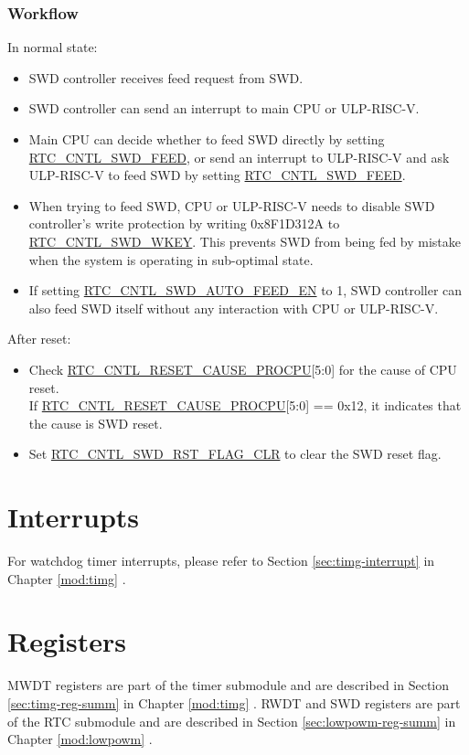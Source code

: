 \documentclass[main\_\_EN.tex]{subfiles}
\begin{document}
\subsubsection{Workflow}
In normal state:
\begin{itemize}
    \item SWD controller receives feed request from SWD.
    \item SWD controller can send an interrupt to main CPU or ULP-RISC-V.
    \item Main CPU can decide whether to feed SWD directly by setting \hyperref[fielddesc:RTCCNTLSWDFEED]{RTC\_CNTL\_SWD\_FEED}, or send an interrupt to ULP-RISC-V and ask ULP-RISC-V to feed SWD by setting \hyperref[fielddesc:RTCCNTLSWDFEED]{RTC\_CNTL\_SWD\_FEED}.
    \item When trying to feed SWD, CPU or ULP-RISC-V needs to disable SWD controller's write protection by writing 0x{}8F1D312A to \hyperref[fielddesc:RTCCNTLSWDWKEY]{RTC\_CNTL\_SWD\_WKEY}. This prevents SWD from being fed by mistake when the system is operating in sub-optimal state.
    \item If setting \hyperref[fielddesc:RTCCNTLSWDAUTOFEEDEN]{RTC\_CNTL\_SWD\_AUTO\_FEED\_EN} to 1, SWD controller can also feed SWD itself without any interaction with CPU or ULP-RISC-V.
\end{itemize}

After reset:
\begin{itemize}
    \item Check \hyperref[fielddesc:RTCCNTLRESETCAUSEPROCPU]{RTC\_CNTL\_RESET\_CAUSE\_PROCPU}[5:0] for the cause of CPU reset.\\
	If \hyperref[fielddesc:RTCCNTLRESETCAUSEPROCPU]{RTC\_CNTL\_RESET\_CAUSE\_PROCPU}[5:0] == 0x{}12, it indicates that the cause is SWD reset.
	\item Set \hyperref[fielddesc:RTCCNTLSWDRSTFLAGCLR]{RTC\_CNTL\_SWD\_RST\_FLAG\_CLR} to clear the SWD reset flag.
\end{itemize}

\section{Interrupts}

For watchdog timer interrupts, please refer to Section \ref{sec:timg-interrupt} \textit{} in Chapter \ref{mod:timg} \textit{}.

\section{Registers}
MWDT registers are part of the timer submodule and are described in Section \ref{sec:timg-reg-summ} \textit{} in Chapter \ref{mod:timg} \textit{}. RWDT and SWD registers are part of the RTC submodule and are described in Section \ref{sec:lowpowm-reg-summ} \textit{} in Chapter \ref{mod:lowpowm} \textit{}.
\end{document}
